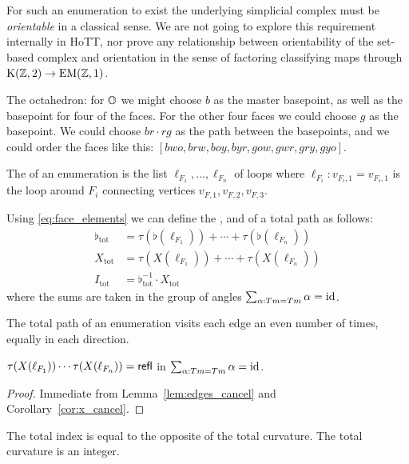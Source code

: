 \begin{mynote}
For such an enumeration to exist the underlying simplicial complex must be \emph{orientable} in a classical sense. We are not going to explore this requirement internally in HoTT, nor prove any relationship between orientability of the set-based complex and orientation in the sense of factoring classifying maps through \( \mathrm{K}(\mathbb{Z},2)\to\mathrm{EM}(\mathbb{Z},1) \).
\end{mynote}

\begin{myex}
The octahedron: for \( \mathbb{O} \) we might choose \( b \) as the master basepoint, as well as the basepoint for four of the faces. For the other four faces we could choose \( g \) as the basepoint. We could choose \( br\cdot rg \) as the path between the basepoints, and we could order the faces like this: \( [bwo, brw, boy, byr, gow, gwr, gry, gyo] \).
\end{myex}

\begin{mydef}
The  of an enumeration is the list \( \ell_{F_1},\ldots,\ell_{F_n} \) of loops where \( \ell_{F_i}:v_{F_i,1}=v_{F_i,1} \) is the loop around \( F_i \) connecting vertices \( v_{F,1}, v_{F,2}, v_{F,3} \).
\end{mydef}

\begin{mydef}
Using \ref{eq:face_elements} we can define the ,  and  of a total path as follows:
\begin{equation}
\label{eq:total_elements}
\begin{aligned}
\flat_\mathrm{tot}&=\tau(\flat(\ell_{F_1}))+\cdots+\tau(\flat(\ell_{F_n}))\\
X_\mathrm{tot}&=\tau(X(\ell_{F_1}))+\cdots+\tau(X(\ell_{F_n}))\\
I_\mathrm{tot}&=\flat_\mathrm{tot}^{-1}\cdot X_\mathrm{tot}
\end{aligned}
\end{equation}
where the sums are taken in the group of angles \( \sum_{\alpha:Tm=Tm}\alpha=\text{id} \).
\end{mydef}

\begin{mylemma}
\label{lem:edges_cancel}
The total path of an enumeration visits each edge an even number of times, equally in each direction.
\end{mylemma}

\begin{mythm}
\( \tau(X(\ell_{F_1}))\cdots\tau(X(\ell_{F_n}))=\mathsf{refl} \) in \( \sum_{\alpha:Tm=Tm}\alpha=\text{id} \). 
\end{mythm}
\begin{proof}
Immediate from Lemma~\ref{lem:edges_cancel} and Corollary~\ref{cor:x_cancel}.
\end{proof}

\begin{mycor}
The total index is equal to the opposite of the total curvature. The total curvature is an integer.
\end{mycor}

